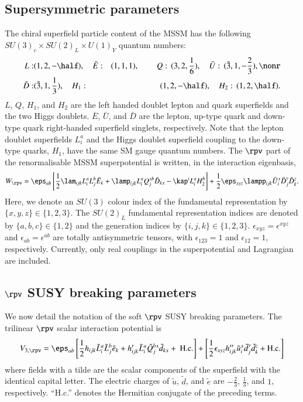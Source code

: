 \documentclass[final,3p,times,pdflatex]{elsarticle}
\begin{document}
\subsection{Supersymmetric parameters \label{susypars}}
The chiral superfield particle content of the MSSM has the 
following $SU(3)_c\times SU(2)_L\times U(1)_Y$ quantum numbers:
\begin{eqnarray}
L:&(1,2,-\half),\quad {\bar E}:&(1,1,1),\qquad\, Q:\,(3,2,\frac{1}{6}),\quad
{\bar U}:\,(\bar 3,1,-\frac{2}{3}),\nonr\\ {\bar D}:&(\bar 3,1,\frac{1}{3}),\quad
H_1:&(1,2,-\half),\quad  H_2:\,(1,2,\half).
\label{fields}
\end{eqnarray}
$L$, $Q$, $H_1$, and $H_2$ are the left handed doublet lepton and
quark superfields and the two Higgs doublets. $\bar E$, $\bar U$, and
$\bar D$ are the lepton, up-type quark and down-type quark
right-handed superfield singlets, respectively. 
Note that the lepton
doublet superfields $L^a_i$ and the Higgs doublet superfield coupling
to the down-type quarks, $H_1$, have the same SM gauge 
quantum numbers. 
The $\rpv$ part of the
renormalisable MSSM superpotential is written, in the interaction eigenbasis,
\begin{equation} 
W_{\rpv}=\eps_{ab}\left[ \frac{1}{2} \lam_{ijk} L_i^a L_j^b{\bar E}_k +
\lamp_{ijk} L_i^a Q_j^{xb} {\bar D}_{kx}  - \kap^i L_i^a H_2^b \right]+
\frac{1}{2}\eps_{xyz} \lampp_{ijk} {\bar U}_i^x{\bar
D}_j^y{\bar D}^z_k. 
 \label{superpot1} 
\end{equation} 
Here, we denote an $SU(3)$ colour index of the fundamental
representation by  $\{x,y,z\} \in \{1,2,3 \}$. The $SU(2)_L$ fundamental
representation indices are denoted by $\{a,b,c\} \in \{1,2\}$ and the generation
indices by $\{i,j,k\} \in \{1,2,3\}$. 
$\epsilon_{xyz}=\epsilon^{xyz}$ and  $\epsilon_{ab}=\epsilon^{ab}$ are totally
antisymmetric tensors, with $\epsilon_{123}=1$ and $\epsilon_{12}=1$,
respectively.  Currently, 
only real couplings in the superpotential and Lagrangian are included. 

\subsection{$\rpv$ SUSY breaking parameters \label{sec:susybreak}}

We now detail the notation of the soft $\rpv$ SUSY breaking parameters. The
trilinear $\rpv$ scalar interaction potential is
\begin{equation}
  V_{3, \rpv} = \eps_{ab} \left[\frac{1}{2}
    h_{ij k}\tilde{L}_i^a \tilde{L}_j^b
    \tilde{{e}}_k +h^\prime_{i jk} \tilde{L}_i^a \tilde{Q}_j^{bx}
    \tilde{d}_{kx} +~{\rm H.c.}
  \right]
   + \left[ \frac{1}{2}\epsilon_{xyz}h^{\prime\prime}_{ijk} \tilde{u}_i^x
  \tilde{d}_j^y \tilde{d}_k^z + {\rm H.c.} \right]
  \label{softhabertril}
\end{equation}
where fields with a tilde are the scalar components of the superfield
with the identical capital letter. The electric charges of $\tilde u$,
$\tilde d$, and $\tilde e$ are $-\frac{2}{3}$, $\frac{1}{3}$, and $1$,
respectively. ``H.c.'' denotes the Hermitian conjugate of the preceding terms.
\end{document}
